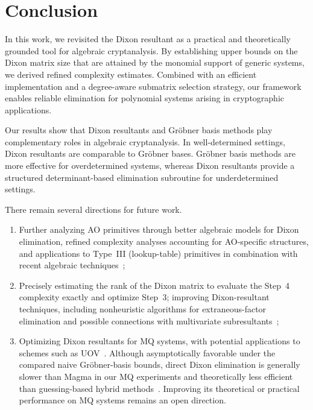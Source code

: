 \section{Conclusion}
\label{Section:Conclusion}

In this work, we revisited the Dixon resultant as a practical and theoretically grounded tool for algebraic cryptanalysis. By establishing upper bounds on the Dixon matrix size that are attained by the monomial support of generic systems, we derived refined complexity estimates. Combined with an efficient implementation and a degree-aware submatrix selection strategy, our framework enables reliable elimination for polynomial systems arising in cryptographic applications.

Our results show that Dixon resultants and Gr\"obner basis methods play complementary roles in algebraic cryptanalysis. In well-determined settings, Dixon resultants are comparable to Gr\"obner bases. Gr\"obner basis methods are more effective for overdetermined systems, whereas Dixon resultants provide a structured determinant-based elimination subroutine for underdetermined settings. 

There remain several directions for future work.
\begin{enumerate}%
	\item Further analyzing AO primitives through better algebraic models for Dixon elimination, refined complexity analyses accounting for AO-specific structures, and applications to Type~III (lookup-table) primitives in combination with recent algebraic techniques~\cite{DBLP:journals/tosc/BakJGP25};

	\item Precisely estimating the rank of the Dixon matrix to evaluate the Step~4 complexity exactly and optimize Step~3; improving Dixon-resultant techniques, including nonheuristic algorithms for extraneous-factor elimination and possible connections with multivariate subresultants~\cite{DBLP:journals/moc/CoxD23};
	
	\item Optimizing Dixon resultants for MQ systems, with potential applications to schemes such as UOV~\cite{DBLP:conf/eurocrypt/KipnisPG99}. Although asymptotically favorable under the compared naive Gr\"obner-basis bounds, direct Dixon elimination is generally slower than Magma in our MQ experiments and theoretically less efficient than guessing-based hybrid methods~\cite{DBLP:journals/jmc/BettaleFP09}. Improving its theoretical or practical performance on MQ systems remains an open direction.
\end{enumerate}
